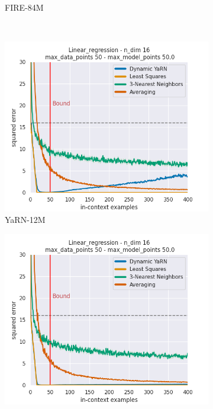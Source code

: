 \documentclass[letterpaper]{article} %
\begin{document}
\begin{figure}[tp]
\begin{subfigure}[t]{0.32\linewidth}
        \caption{FIRE-84M}
    \end{subfigure}
    \\
    \begin{subfigure}[t]{0.32\linewidth}
        \includegraphics[width=\linewidth]{AnonymousSubmission/LaTeX/imgs/analysis/small-dynamic-yarn.png}
        \caption{YaRN-12M}
    \end{subfigure}
    \begin{subfigure}[t]{0.32\linewidth}
        \includegraphics[width=\linewidth]{AnonymousSubmission/LaTeX/imgs/experiments/linear-regression/dynamic-yarn.png}

\end{subfigure}
\end{figure}
\end{document}
